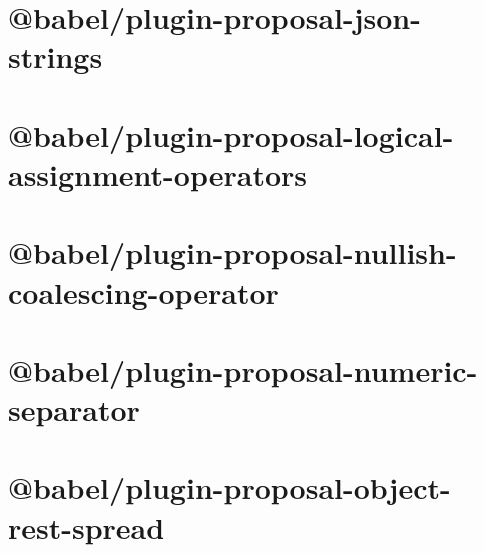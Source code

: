 \documentclass[twoside]{book}
\newcommand{\+}{\discretionary{\mbox{\scriptsize$\hookleftarrow$}}{}{}}
\begin{document}
\chapter{@babel/plugin-\/proposal-\/json-\/strings}
\label{md__c___users_vaishnavi_jadhav__desktop__developer_code_mean_stack_example_client_node_modules__d2c926c699c4c0b4219791b6c49ed228}

\chapter{@babel/plugin-\/proposal-\/logical-\/assignment-\/operators}
\label{md__c___users_vaishnavi_jadhav__desktop__developer_code_mean_stack_example_client_node_modules__c318e2eb4b5e76e11295c017a6ebc04f}

\chapter{@babel/plugin-\/proposal-\/nullish-\/coalescing-\/operator}
\label{md__c___users_vaishnavi_jadhav__desktop__developer_code_mean_stack_example_client_node_modules__d7e652c539266e4379e515f6e4163a9d}

\chapter{@babel/plugin-\/proposal-\/numeric-\/separator}
\label{md__c___users_vaishnavi_jadhav__desktop__developer_code_mean_stack_example_client_node_modules__49da5297b016d285f3d2c13208cc3dc1}

\chapter{@babel/plugin-\/proposal-\/object-\/rest-\/spread}
\label{md__c___users_vaishnavi_jadhav__desktop__developer_code_mean_stack_example_client_node_modules__e27f94f752247d8074fad6c84eb604fb}

\end{document}
